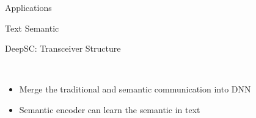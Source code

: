 \documentclass[presentation,mathserif,9pt]{beamer}
\begin{document}
\begin{section}{Applications}
\begin{subsection}{Text Semantic}
		\begin{frame}{DeepSC: Transceiver Structure}
			\begin{figure}
				\\
			\end{figure}
			\vspace{-0.3cm}
			\begin{itemize}
				\item Merge the traditional and semantic communication into DNN
				\item Semantic encoder can learn the semantic in text
			\end{itemize}
		\end{frame}


\end{subsection}
\end{section}
\end{document}
